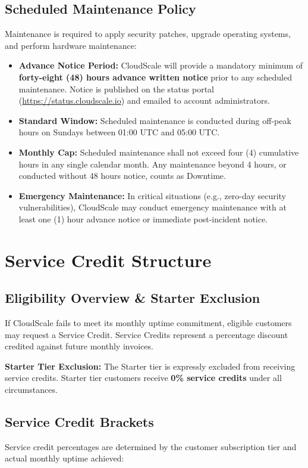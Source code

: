 \documentclass[10pt,letterpaper]{article}
\begin{document}
\subsection{Scheduled Maintenance Policy}
Maintenance is required to apply security patches, upgrade operating systems, and perform hardware maintenance:
\begin{itemize}[leftmargin=1.5em, itemsep=0.5pt, topsep=1pt]
  \item \textbf{Advance Notice Period:} CloudScale will provide a mandatory minimum of \textbf{forty-eight (48) hours advance written notice} prior to any scheduled maintenance. Notice is published on the status portal (\url{https://status.cloudscale.io}) and emailed to account administrators.
  \item \textbf{Standard Window:} Scheduled maintenance is conducted during off-peak hours on Sundays between 01:00 UTC and 05:00 UTC.
  \item \textbf{Monthly Cap:} Scheduled maintenance shall not exceed four (4) cumulative hours in any single calendar month. Any maintenance beyond 4 hours, or conducted without 48 hours notice, counts as Downtime.
  \item \textbf{Emergency Maintenance:} In critical situations (e.g., zero-day security vulnerabilities), CloudScale may conduct emergency maintenance with at least one (1) hour advance notice or immediate post-incident notice.
\end{itemize}

\section{Service Credit Structure}

\subsection{Eligibility Overview \& Starter Exclusion}
If CloudScale fails to meet its monthly uptime commitment, eligible customers may request a Service Credit. Service Credits represent a percentage discount credited against future monthly invoices.

\textbf{Starter Tier Exclusion:} The Starter tier is expressly excluded from receiving service credits. Starter tier customers receive \textbf{0\% service credits} under all circumstances.

\subsection{Service Credit Brackets}
Service credit percentages are determined by the customer subscription tier and actual monthly uptime achieved:
\end{document}
